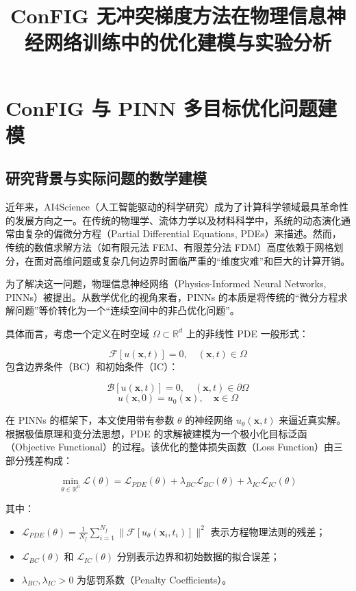 \documentclass[UTF8,a4paper,12pt,fontset=none]{ctexart}
\title{ConFIG 无冲突梯度方法在物理信息神经网络训练中的优化建模与实验分析}
\author{}
\date{}
\begin{document}
\maketitle
\tableofcontents
\newpage



\section{ConFIG 与 PINN 多目标优化问题建模}

\subsection{研究背景与实际问题的数学建模}

近年来，AI4Science（人工智能驱动的科学研究）成为了计算科学领域最具革命性的发展方向之一。在传统的物理学、流体力学以及材料科学中，系统的动态演化通常由复杂的偏微分方程（Partial Differential Equations, PDEs）来描述。然而，传统的数值求解方法（如有限元法 FEM、有限差分法 FDM）高度依赖于网格划分，在面对高维问题或复杂几何边界时面临严重的“维度灾难”和巨大的计算开销。


为了解决这一问题，物理信息神经网络（Physics-Informed Neural Networks, PINNs）被提出。从数学优化的视角来看，PINNs 的本质是将传统的“微分方程求解问题”等价转化为一个“连续空间中的非凸优化问题”。


具体而言，考虑一个定义在时空域 $\Omega \subset \mathbb{R}^d$ 上的非线性 PDE 一般形式：

\[
\mathcal{F}[u(\mathbf{x}, t)] = 0, \quad (\mathbf{x}, t) \in \Omega
\]
包含边界条件（BC）和初始条件（IC）：

\[
\mathcal{B}[u(\mathbf{x}, t)] = 0, \quad (\mathbf{x}, t) \in \partial\Omega
\]
\[
u(\mathbf{x}, 0) = u_0(\mathbf{x}), \quad \mathbf{x} \in \Omega
\]

在 PINNs 的框架下，本文使用带有参数 $\theta$ 的神经网络 $u_\theta(\mathbf{x}, t)$ 来逼近真实解。根据极值原理和变分法思想，PDE 的求解被建模为一个极小化目标泛函（Objective Functional）的过程。该优化的整体损失函数（Loss Function）由三部分残差构成：

\[
\min_{\theta \in \mathbb{R}^n} \mathcal{L}(\theta) = \mathcal{L}_{PDE}(\theta) + \lambda_{BC} \mathcal{L}_{BC}(\theta) + \lambda_{IC} \mathcal{L}_{IC}(\theta)
\]

其中：

\begin{itemize}
\item $\mathcal{L}_{PDE}(\theta) = \frac{1}{N_f} \sum_{i=1}^{N_f} \| \mathcal{F}[u_\theta(\mathbf{x}_i, t_i)] \|^2$ 表示方程物理法则的残差；
\item $\mathcal{L}_{BC}(\theta)$ 和 $\mathcal{L}_{IC}(\theta)$ 分别表示边界和初始数据的拟合误差；
\item $\lambda_{BC}, \lambda_{IC} > 0$ 为惩罚系数（Penalty Coefficients）。
\end{itemize}
\end{document}
